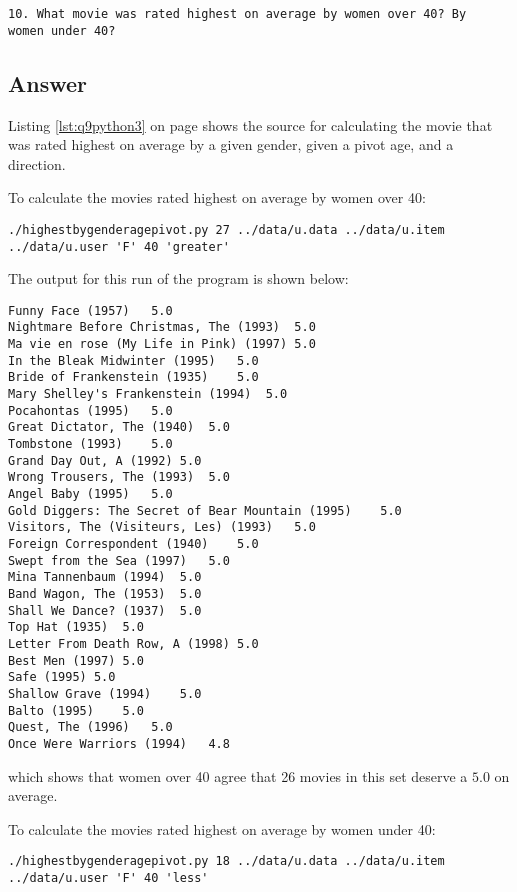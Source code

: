 \documentclass[letterpaper,11pt]{article}
\begin{document}
\begin{verbatim}
10. What movie was rated highest on average by women over 40? By
women under 40?
\end{verbatim}

\subsection*{Answer}

Listing \ref{lst:q9python3} on page \pageref{lst:q9python3} shows the source for calculating the movie that was rated highest on average by a given gender, given a pivot age, and a direction.

To calculate the movies rated highest on average by women over 40:
\begin{lstlisting}[frame=single]
./highestbygenderagepivot.py 27 ../data/u.data ../data/u.item ../data/u.user 'F' 40 'greater'
\end{lstlisting}

The output for this run of the program is shown below:
\begin{lstlisting}[frame=single]
Funny Face (1957)	5.0
Nightmare Before Christmas, The (1993)	5.0
Ma vie en rose (My Life in Pink) (1997)	5.0
In the Bleak Midwinter (1995)	5.0
Bride of Frankenstein (1935)	5.0
Mary Shelley's Frankenstein (1994)	5.0
Pocahontas (1995)	5.0
Great Dictator, The (1940)	5.0
Tombstone (1993)	5.0
Grand Day Out, A (1992)	5.0
Wrong Trousers, The (1993)	5.0
Angel Baby (1995)	5.0
Gold Diggers: The Secret of Bear Mountain (1995)	5.0
Visitors, The (Visiteurs, Les) (1993)	5.0
Foreign Correspondent (1940)	5.0
Swept from the Sea (1997)	5.0
Mina Tannenbaum (1994)	5.0
Band Wagon, The (1953)	5.0
Shall We Dance? (1937)	5.0
Top Hat (1935)	5.0
Letter From Death Row, A (1998)	5.0
Best Men (1997)	5.0
Safe (1995)	5.0
Shallow Grave (1994)	5.0
Balto (1995)	5.0
Quest, The (1996)	5.0
Once Were Warriors (1994)	4.8
\end{lstlisting}
which shows that women over 40 agree that 26 movies in this set deserve a $5.0$ on average.

To calculate the movies rated highest on average by women under 40:
\begin{lstlisting}[frame=single]
./highestbygenderagepivot.py 18 ../data/u.data ../data/u.item ../data/u.user 'F' 40 'less'
\end{lstlisting}
\end{document}
